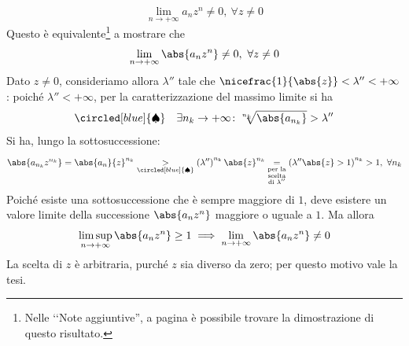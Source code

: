 \begin{demonstrationcaputwt}
\begin{enumerate}[label=\Roman*]
	\begin{equation*}
		\lim_{n\to+\infty}a_nz^n\neq 0,\ \forall z\neq 0
	\end{equation*}
	Questo è equivalente\footnote{Nelle ‘‘Note aggiuntive'', a pagina \pageref{equivalenzalimiteemodulolimite} è possibile trovare la dimostrazione di questo risultato.} a mostrare che
	\begin{equation*}
		\lim_{n\to+\infty}\abs{a_nz^n}\neq 0,\ \forall z\neq 0
	\end{equation*}
	Dato $z\neq 0$, consideriamo allora $\lambda''$ tale che $\nicefrac{1}{\abs{z}}<\lambda''<+\infty$: poiché $\lambda''<+\infty$, per la caratterizzazione del massimo limite si ha
	\begin{equation*}
		\circled[blue]{\spadesuit}\quad\exists n_k\to+\infty\colon\sqrt[n_k]{\abs{a_{n_k}}}>\lambda''
	\end{equation*}
	Si ha, lungo la sottosuccessione:
	\begin{equation*}
		\abs{a_{n_k}z^{n_k}}=\abs{a_n}{z}^{n_k}\underset{\circled[blue]{\spadesuit}}{>}\left(\lambda''\right)^{n_k}\abs{z}^{n_k}\underset{\substack{\text{per la}\\\text{scelta}\\\text{di }\lambda''}}{=}\left(\lambda''\abs{z}>1\right)^{n_k}>1,\ \forall n_k
	\end{equation*}
	Poiché esiste una sottosuccessione che è sempre maggiore di $1$, deve esistere un valore limite della successione $\abs{a_nz^n}$ maggiore o uguale a $1$. Ma allora
	\begin{equation*}
		\limsup_{n\to+\infty}\abs{a_nz^n}\geq 1\implies\lim_{n\to+\infty}\abs{a_nz^n}\neq 0
	\end{equation*}
	La scelta di $z$ è arbitraria, purché $z$ sia diverso da zero; per questo motivo vale la tesi.\qedhere
	\end{enumerate}
\end{demonstrationcaputwt}
